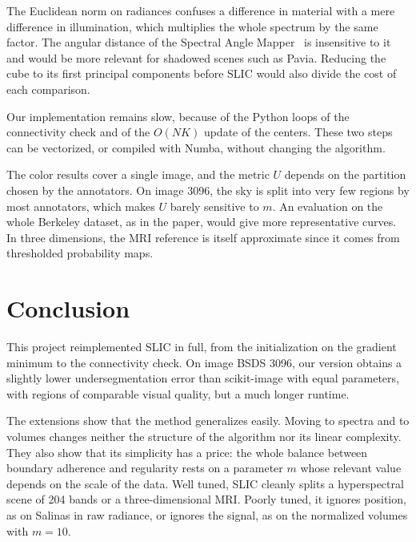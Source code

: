  The Euclidean norm on
radiances confuses a difference in material with
a mere difference in illumination, which multiplies the whole
spectrum by the same factor. The angular distance
of the Spectral Angle Mapper~\cite{kruse} is insensitive to it and would be
more relevant for shadowed scenes such as Pavia.
Reducing the cube to its first principal components
before SLIC would also divide the cost of each comparison.

 Our implementation remains slow,
because of the Python loops of the connectivity check and
of the $O(NK)$ update of the centers. These two steps
can be vectorized, or compiled with Numba, without changing the algorithm.

 The color results cover a
single image, and the metric $U$ depends on the partition
chosen by the annotators. On image 3096, the sky is
split into very few regions by most
annotators, which makes $U$ barely sensitive to $m$. An evaluation
on the whole Berkeley dataset, as in
the paper, would give more representative curves. In
three dimensions, the MRI reference is itself approximate since it comes from thresholded probability maps.

\section{Conclusion}
This project reimplemented SLIC in full, from the initialization on the gradient minimum to the
connectivity check. On image BSDS 3096, our version obtains
a slightly lower undersegmentation error
than scikit-image with equal parameters, with
regions of comparable visual quality, but a much longer runtime.

The extensions show that the method generalizes
easily. Moving to spectra and to volumes
changes neither the structure of the algorithm nor its linear
complexity. They also show that its simplicity has a price:
the whole balance between boundary adherence and regularity
rests on a parameter $m$ whose relevant value
depends on the scale of the data. Well tuned, SLIC cleanly splits
a hyperspectral scene of 204 bands or
a three-dimensional MRI. Poorly tuned, it ignores
position, as on Salinas in raw radiance, or ignores
the signal, as on the normalized volumes with $m = 10$.

